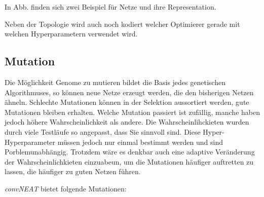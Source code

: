 \documentclass[]{scrartcl}
\begin{document}
			In Abb. finden sich zwei Beispiel für Netze und ihre Representation.


			Neben der Topologie wird auch noch kodiert welcher Optimierer gerade mit welchen Hyperparametern verwendet wird.

		\subsection{Mutation}

			Die Möglichkeit Genome zu mutieren bildet die Basis jedes genetischen Algorithmuses, so können neue Netze erzeugt werden, die den
			bisherigen Netzen ähneln. Schlechte Mutationen können in der Selektion aussortiert werden, gute Mutationen bleiben erhalten.
			Welche Mutation passiert ist zufällig, manche haben jedoch höhere Wahrscheinlichkeit als andere.
			Die Wahrscheinlihckieten wurden durch viele Testläufe so angepasst, dass Sie sinnvoll sind.
			Diese Hyper-Hyperparameter müssen jedoch nur einmal bestimmt werden und sind Porblemunabhängig.
			Trotzdem wäre es denkbar auch eine adaptive Veränderung der Wahrscheinlichkieten einzuabeun, um die Mutationen häufiger auftretten zu lassen,
			die häufiger zu guten Netzen führen.

			\textit{convNEAT} bietet folgende Mutationen:
\end{document}
